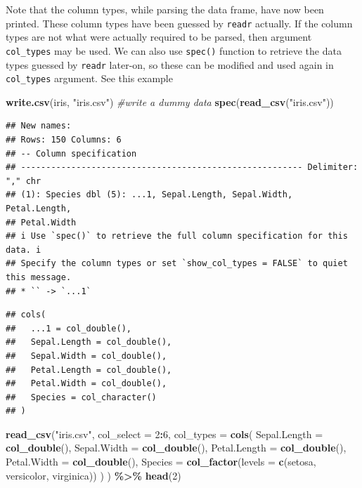 \documentclass[
]{book}
\newenvironment{Shaded}{\begin{snugshade}}{\end{snugshade}}
\newcommand{\AttributeTok}[1]{\textcolor[rgb]{0.13,0.29,0.53}{#1}}
\newcommand{\CommentTok}[1]{\textcolor[rgb]{0.56,0.35,0.01}{\textit{#1}}}
\newcommand{\DecValTok}[1]{\textcolor[rgb]{0.00,0.00,0.81}{#1}}
\newcommand{\FunctionTok}[1]{\textcolor[rgb]{0.13,0.29,0.53}{\textbf{#1}}}
\newcommand{\NormalTok}[1]{#1}
\newcommand{\SpecialCharTok}[1]{\textcolor[rgb]{0.81,0.36,0.00}{\textbf{#1}}}
\newcommand{\StringTok}[1]{\textcolor[rgb]{0.31,0.60,0.02}{#1}}
\begin{document}
Note that the column types, while parsing the data frame, have now been printed. These column types have been guessed by \texttt{readr} actually. If the column types are not what were actually required to be parsed, then argument \texttt{col\_types} may be used. We can also use \texttt{spec()} function to retrieve the data types guessed by \texttt{readr} later-on, so these can be modified and used again in \texttt{col\_types} argument. See this example

\begin{Shaded}
\begin{Highlighting}[]
\FunctionTok{write.csv}\NormalTok{(iris, }\StringTok{"iris.csv"}\NormalTok{) }\CommentTok{\#write a dummy data}
\FunctionTok{spec}\NormalTok{(}\FunctionTok{read\_csv}\NormalTok{(}\StringTok{"iris.csv"}\NormalTok{))}
\end{Highlighting}
\end{Shaded}

\begin{verbatim}
## New names:
## Rows: 150 Columns: 6
## -- Column specification
## -------------------------------------------------------- Delimiter: "," chr
## (1): Species dbl (5): ...1, Sepal.Length, Sepal.Width, Petal.Length,
## Petal.Width
## i Use `spec()` to retrieve the full column specification for this data. i
## Specify the column types or set `show_col_types = FALSE` to quiet this message.
## * `` -> `...1`
\end{verbatim}

\begin{verbatim}
## cols(
##   ...1 = col_double(),
##   Sepal.Length = col_double(),
##   Sepal.Width = col_double(),
##   Petal.Length = col_double(),
##   Petal.Width = col_double(),
##   Species = col_character()
## )
\end{verbatim}

\begin{Shaded}
\begin{Highlighting}[]
\FunctionTok{read\_csv}\NormalTok{(}\StringTok{"iris.csv"}\NormalTok{,}
         \AttributeTok{col\_select =} \DecValTok{2}\SpecialCharTok{:}\DecValTok{6}\NormalTok{,}
         \AttributeTok{col\_types =} \FunctionTok{cols}\NormalTok{(}
           \AttributeTok{Sepal.Length =} \FunctionTok{col\_double}\NormalTok{(),}
           \AttributeTok{Sepal.Width =} \FunctionTok{col\_double}\NormalTok{(),}
           \AttributeTok{Petal.Length =} \FunctionTok{col\_double}\NormalTok{(),}
           \AttributeTok{Petal.Width =} \FunctionTok{col\_double}\NormalTok{(),}
           \AttributeTok{Species =} \FunctionTok{col\_factor}\NormalTok{(}\AttributeTok{levels =} \FunctionTok{c}\NormalTok{(}\StringTok{\textquotesingle{}setosa\textquotesingle{}}\NormalTok{, }\StringTok{\textquotesingle{}versicolor\textquotesingle{}}\NormalTok{, }\StringTok{\textquotesingle{}virginica\textquotesingle{}}\NormalTok{))}
\NormalTok{         )}
\NormalTok{) }\SpecialCharTok{\%\textgreater{}\%} \FunctionTok{head}\NormalTok{(}\DecValTok{2}\NormalTok{)}
\end{Highlighting}
\end{Shaded}
\end{document}

